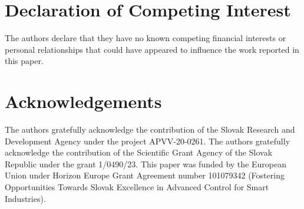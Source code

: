 \documentclass[preprint,12pt,authoryear]{elsarticle}
\begin{document}
\section*{Declaration of Competing Interest}
The authors declare that they have no known competing financial interests or personal relationships that could have appeared to influence the work reported in this paper.

\section*{Acknowledgements}
The authors gratefully acknowledge the contribution of the Slovak Research and Development Agency under the project APVV-20-0261. The authors gratefully acknowledge the contribution of the Scientific Grant Agency of the Slovak Republic under the grant 1/0490/23. This paper was funded by the European Union under Horizon Europe Grant Agreement number 101079342 (Fostering Opportunities Towards Slovak Excellence in Advanced Control for Smart Industries).








\end{document}
